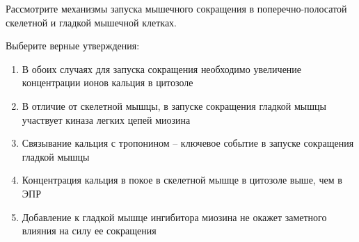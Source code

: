 
Рассмотрите механизмы запуска мышечного сокращения
в поперечно-полосатой скелетной и гладкой мышечной клетках.


Выберите
верные утверждения:

\begin{enumerate}
    \item В обоих случаях для запуска сокращения необходимо увеличение концентрации ионов кальция в цитозоле
    \item В отличие от скелетной мышцы, в запуске сокращения гладкой мышцы участвует киназа легких цепей миозина
    \item Связывание кальция с тропонином – ключевое событие в запуске сокращения гладкой мышцы
    \item Концентрация кальция в покое в скелетной мышце в цитозоле выше, чем в ЭПР
    \item Добавление к гладкой мышце ингибитора миозина не окажет заметного влияния на силу ее сокращения
\end{enumerate}

\explanationSection

